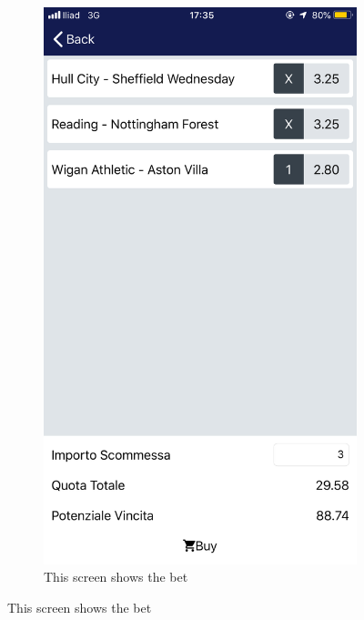 \documentclass[numbers=noenddot, 12pt, a4paper, oneside]{scrbook}
\begin{document}
\begin{figure}[H]
\begin{subfigure}{.5\textwidth}
		\includegraphics[width=.8\linewidth]{images/Screen/Carrello}
		\caption{This screen shows the bet}
	\end{subfigure}
\end{figure}
\end{document}
